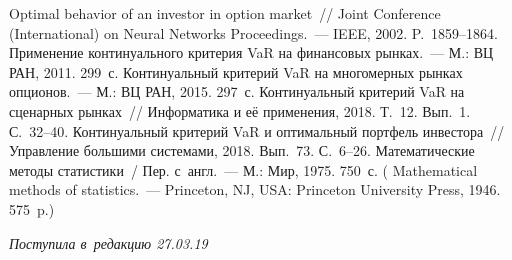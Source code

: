 \begin{multicols}{2}
\vspace*{-6pt}
  
{\small\frenchspacing
 {%
 \begin{thebibliography}{9}
   Optimal behavior of an investor in option market~//  
Joint Conference (International) on Neural Networks Proceedings.~--- 
 IEEE, 2002. P.~1859--1864. 
   Применение континуального критерия VaR на 
финансовых рынках.~--- М.: ВЦ РАН, 2011. 299~с. 
   Континуальный критерий VaR на многомерных рынках 
опционов.~--- М.: ВЦ РАН, 2015. 297~с. 
   Континуальный критерий VaR на сценарных рынках~// 
Информатика и её применения, 2018. Т.~12. Вып.~1. С.~32--40. 
   Континуальный критерий VaR и оптимальный 
портфель инвестора~// Управление большими системами, 2018. Вып.~73.  
С.~6--26.
   Математические методы статистики~/ Пер. с~англ.~--- М.: 
Мир, 1975. 750~с. ( Mathematical methods of statistics.~--- 
Princeton, NJ, USA: Princeton University Press, 1946. 575~p.)
 \end{thebibliography}

 }
 }

\end{multicols}

\vspace*{-7pt}

\hfill{\small\textit{Поступила в~редакцию 27.03.19}}



\newpage

\vspace*{-28pt}





\def\tit{THEORETICAL FOUNDATIONS OF~CONTINUOUS VaR CRITERION OPTIMIZATION 
IN~THE~COLLECTION OF~MARKETS}


\def\titkol{Theoretical foundations of~continuous VaR criterion  optimization 
in~the~collection of~markets}

\def\aut{G.\,A.~Agasandyan}

